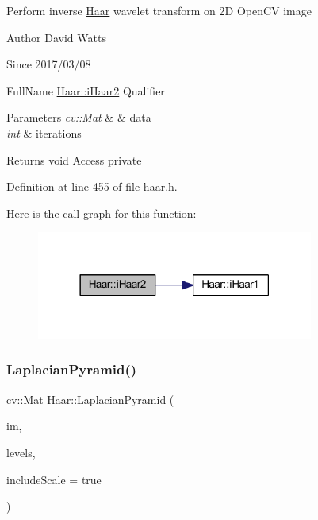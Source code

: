 Perform inverse \hyperlink{class_haar}{Haar} wavelet transform on 2D Open\+CV image

\begin{DoxyAuthor}{Author}
David Watts 
\end{DoxyAuthor}
\begin{DoxySince}{Since}
2017/03/08
\end{DoxySince}
Full\+Name \hyperlink{class_haar_ab2c372ee9f5eec084066ba52de18fbbe}{Haar\+::i\+Haar2} Qualifier 
\begin{DoxyParams}{Parameters}
{\em cv\+::\+Mat} & \& data \\
\hline
{\em int} & iterations \\
\hline
\end{DoxyParams}
\begin{DoxyReturn}{Returns}
void Access private 
\end{DoxyReturn}


Definition at line 455 of file haar.\+h.

Here is the call graph for this function\+:
\nopagebreak
\begin{figure}[H]
\begin{center}
\leavevmode
\includegraphics[width=258pt]{class_haar_a4516357f347f25499ac6aebb717e4f48_cgraph}
\end{center}
\end{figure}
\mbox{\label{class_haar_ad85443bf4bbe9d65be10acbd0d89093b}} 
\subsubsection{\texorpdfstring{Laplacian\+Pyramid()}{LaplacianPyramid()}}
{\footnotesize\ttfamily cv\+::\+Mat Haar\+::\+Laplacian\+Pyramid (\begin{DoxyParamCaption}\item[{cv\+::\+Mat}]{im,  }\item[{int}]{levels,  }\item[{bool}]{include\+Scale = {\ttfamily true} }\end{DoxyParamCaption})\hspace{0.3cm}{\ttfamily [static]}}

